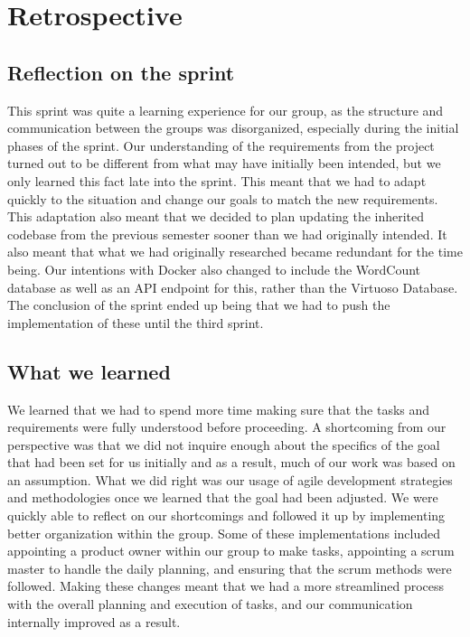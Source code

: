 \section{Retrospective}

\subsection{Reflection on the sprint}
This sprint was quite a learning experience for our group, as the structure and communication between the \knox{} groups was disorganized, especially during the initial phases of the sprint. 
Our understanding of the requirements from the \knox{} project turned out to be different from what may have initially been intended, but we only learned this fact late into the sprint. 
This meant that we had to adapt quickly to the situation and change our goals to match the new requirements. 
This adaptation also meant that we decided to plan updating the inherited codebase from the previous semester sooner than we had originally intended. 
It also meant that what we had originally researched became redundant for the time being.
Our intentions with Docker also changed to include the WordCount database as well as an API endpoint for this, rather than the Virtuoso Database. 
The conclusion of the sprint ended up being that we had to push the implementation of these until the third sprint.

\subsection{What we learned}
We learned that we had to spend more time making sure that the tasks and requirements were fully understood before proceeding. 
A shortcoming from our perspective was that we did not inquire enough about the specifics of the goal that had been set for us initially and as a result, much of our work was based on an assumption. 
What we did right was our usage of agile development strategies and methodologies once we learned that the goal had been adjusted. 
We were quickly able to reflect on our shortcomings and followed it up by implementing better organization within the group. 
Some of these implementations included appointing a product owner within our group to make tasks, appointing a scrum master to handle the daily planning, and ensuring that the scrum methods were followed. 
Making these changes meant that we had a more streamlined process with the overall planning and execution of tasks, and our communication internally improved as a result.

